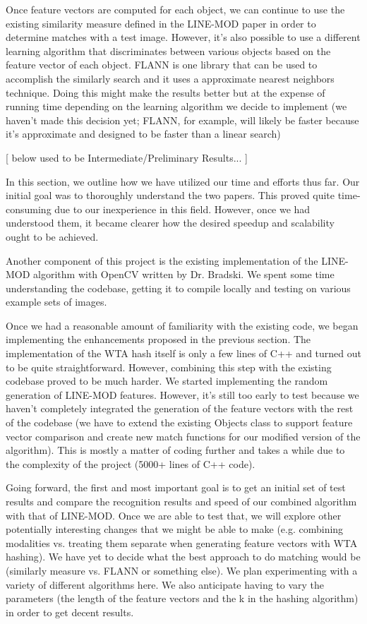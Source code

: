 \documentclass[10pt,twocolumn,letterpaper]{article}
\begin{document}
Once feature vectors are computed for each object, we can continue to use the existing similarity measure defined in the LINE-MOD paper in order to determine matches with a test image. However, it's also possible to use a different learning algorithm that discriminates between various objects based on the feature vector of each object. FLANN is one library that can be used to accomplish the similarly search and it uses a approximate nearest neighbors technique. Doing this might make the results better but at the expense of running time depending on the learning algorithm we decide to implement (we haven't made this decision yet; FLANN, for example, will likely be faster because it's approximate and designed to be faster than a linear search)

[ below used to be Intermediate/Preliminary Results... ]

In this section, we outline how we have utilized our time and efforts thus far. Our initial goal was to thoroughly understand the two papers. This proved quite time-consuming due to our inexperience in this field. However, once we had understood them, it became clearer how the desired speedup and scalability ought to be achieved.

Another component of this project is the existing implementation of the LINE-MOD algorithm with OpenCV written by Dr. Bradski. We spent some time understanding the codebase, getting it to compile locally and testing on various example sets of images.

Once we had a reasonable amount of familiarity with the existing code, we began implementing the enhancements proposed in the previous section. The implementation of the WTA hash itself is only a few lines of C++ and turned out to be quite straightforward. However, combining this step with the existing codebase proved to be much harder. We started implementing the random generation of LINE-MOD features. However, it's still too early to test because we haven't completely integrated the generation of the feature vectors with the rest of the codebase (we have to extend the existing Objects class to support feature vector comparison and create new match functions for our modified version of the algorithm). This is mostly a matter of coding further and takes a while due to the complexity of the project (5000+ lines of C++ code).

Going forward, the first and most important goal is to get an initial set of test results and compare the recognition results and speed of our combined algorithm with that of LINE-MOD. Once we are able to test that, we will explore other potentially interesting changes that we might be able to make (e.g. combining modalities vs. treating them separate when generating feature vectors with WTA hashing). We have yet to decide what the best approach to do matching would be (similarly measure vs. FLANN or something else). We plan experimenting with a variety of different algorithms here. We also anticipate having to vary the parameters (the length of the feature vectors and the k in the hashing algorithm) in order to get decent results.
\end{document}
